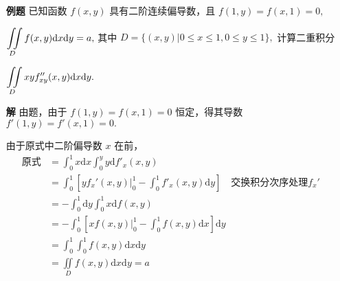 \begin{itemize}
    \item[\textbf{例题}] 已知函数 $ f(x,y) $ 具有二阶连续偏导数，且 $ f(1,y) = f (x,1) = 0,$
    
    $ \displaystyle \iint\limits_{D}f(x,y)\mathrm{d}x\mathrm{d}y = a, $ 
    其中 $ D = \{(x,y)|0\leq x\leq 1, 0\leq y \leq 1\}, $ 
    计算二重积分

    $ \displaystyle \iint\limits_{D}xyf^{\prime\prime}_{xy}(x,y)\mathrm{d}x\mathrm{d}y. $ 
    \item[\textbf{解}] 
    由题，由于 $ f(1,y) = f (x,1) = 0 $ 恒定，得其导数 $ f'(1,y) = f'(x,1) = 0.$

    由于原式中二阶偏导数 $ x $ 在前，
    \begin{equation*}
        \begin{aligned}
            \textrm{原式}&= \int_0^1 x\mathrm{d}x\int_0^y y\mathrm{d}f'_x(x,y) \\ 
            &= \int_0^1 \left[yf_x'(x,y)\big|_0^1 - \int_0^1f'_x(x,y)\mathrm{d}y\right] 
            \quad{}\textrm{交换积分次序处理}f_x' \\ 
            &= -\int_0^1\mathrm{d}y\int_0^1 x\mathrm{d}f(x,y)\\ &= 
            -\int_0^1\left[xf(x,y)\big|_0^1 - \int_0^1f(x,y)\mathrm{d}x\right]\mathrm{d}y \\&= 
            \int_0^1\int_0^1f(x,y)\mathrm{d}x\mathrm{d}y \\&= 
            \iint\limits_{D}f(x,y)\mathrm{d}x\mathrm{d}y = a
        \end{aligned}
    \end{equation*}
\end{itemize}

